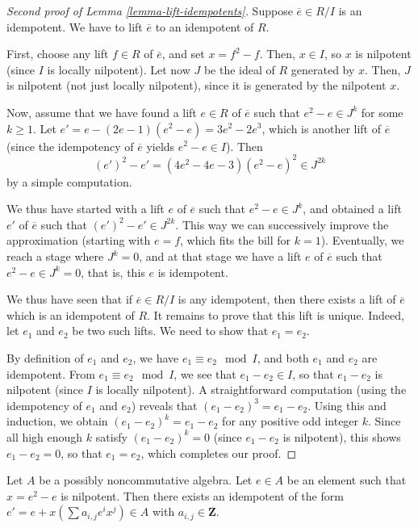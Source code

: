 \begin{proof}[Second proof of Lemma \ref{lemma-lift-idempotents}]
Suppose $\overline{e} \in R/I$ is an idempotent.
We have to lift $\overline{e}$ to an idempotent of $R$.

\medskip\noindent
First, choose any lift $f \in R$ of $\overline{e}$, and set
$x = f^2 - f$. Then, $x \in I$, so $x$ is nilpotent (since $I$
is locally nilpotent). Let now $J$ be the ideal of $R$ generated
by $x$. Then, $J$ is nilpotent (not just locally nilpotent),
since it is generated by the nilpotent $x$.

\medskip\noindent
Now, assume that we have found a lift $e \in R$ of $\overline{e}$
such that $e^2 - e \in J^k$ for some $k \geq 1$.
Let $e' = e - (2e - 1)(e^2 - e) = 3e^2 - 2e^3$, which is another
lift of $\overline{e}$ (since the idempotency of $\overline{e}$
yields $e^2 - e \in I$). Then
$$
(e')^2 - e' = (4e^2 - 4e - 3)(e^2 - e)^2 \in J^{2k}
$$
by a simple computation.

\medskip\noindent
We thus have started with a lift $e$ of $\overline{e}$ such
that $e^2 - e \in J^k$, and obtained a lift $e'$ of
$\overline{e}$ such that $(e')^2 - e' \in J^{2k}$.
This way we can successively improve the approximation
(starting with $e = f$, which fits the bill for $k = 1$).
Eventually, we reach a stage where $J^k = 0$, and at that
stage we have a lift $e$ of $\overline{e}$ such that
$e^2 - e \in J^k = 0$, that is, this $e$ is idempotent.

\medskip\noindent
We thus have seen that if $\overline{e} \in R/I$ is any
idempotent, then there exists a lift of $\overline{e}$
which is an idempotent of $R$.
It remains to prove that this lift is unique. Indeed, let
$e_1$ and $e_2$ be two such lifts. We
need to show that $e_1 = e_2$.

\medskip\noindent
By definition of $e_1$ and $e_2$, we have $e_1 \equiv e_2
\mod I$, and both $e_1$ and $e_2$ are idempotent. From
$e_1 \equiv e_2 \mod I$, we see that $e_1 - e_2 \in I$,
so that $e_1 - e_2$ is nilpotent (since $I$ is locally nilpotent).
A straightforward
computation (using the idempotency of $e_1$ and $e_2$)
reveals that $(e_1 - e_2)^3 = e_1 - e_2$. Using this and
induction, we obtain $(e_1 - e_2)^k = e_1 - e_2$ for any
positive odd integer $k$. Since all high enough $k$ satisfy
$(e_1 - e_2)^k = 0$ (since $e_1 - e_2$ is nilpotent),
this shows $e_1 - e_2 = 0$, so that $e_1 = e_2$, which
completes our proof.
\end{proof}

\begin{lemma}
\label{lemma-lift-idempotents-noncommutative}
Let $A$ be a possibly noncommutative algebra.
Let $e \in A$ be an element such that $x = e^2 - e$ is nilpotent.
Then there exists an idempotent of the form
$e' = e + x(\sum a_{i, j}e^ix^j) \in A$
with $a_{i, j} \in \mathbf{Z}$.
\end{lemma}

